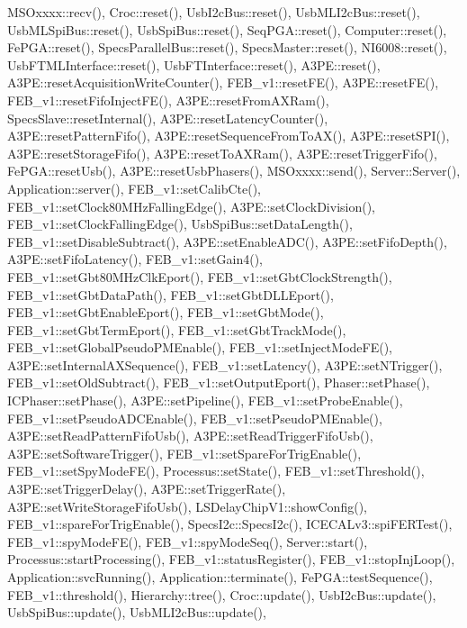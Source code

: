 M\+S\+Oxxxx\+::recv(), Croc\+::reset(), Usb\+I2c\+Bus\+::reset(), Usb\+M\+L\+I2c\+Bus\+::reset(), Usb\+M\+L\+Spi\+Bus\+::reset(), Usb\+Spi\+Bus\+::reset(), Seq\+P\+G\+A\+::reset(), Computer\+::reset(), Fe\+P\+G\+A\+::reset(), Specs\+Parallel\+Bus\+::reset(), Specs\+Master\+::reset(), N\+I6008\+::reset(), Usb\+F\+T\+M\+L\+Interface\+::reset(), Usb\+F\+T\+Interface\+::reset(), A3\+P\+E\+::reset(), A3\+P\+E\+::reset\+Acquisition\+Write\+Counter(), F\+E\+B\+\_\+v1\+::reset\+F\+E(), A3\+P\+E\+::reset\+F\+E(), F\+E\+B\+\_\+v1\+::reset\+Fifo\+Inject\+F\+E(), A3\+P\+E\+::reset\+From\+A\+X\+Ram(), Specs\+Slave\+::reset\+Internal(), A3\+P\+E\+::reset\+Latency\+Counter(), A3\+P\+E\+::reset\+Pattern\+Fifo(), A3\+P\+E\+::reset\+Sequence\+From\+To\+A\+X(), A3\+P\+E\+::reset\+S\+P\+I(), A3\+P\+E\+::reset\+Storage\+Fifo(), A3\+P\+E\+::reset\+To\+A\+X\+Ram(), A3\+P\+E\+::reset\+Trigger\+Fifo(), Fe\+P\+G\+A\+::reset\+Usb(), A3\+P\+E\+::reset\+Usb\+Phasers(), M\+S\+Oxxxx\+::send(), Server\+::\+Server(), Application\+::server(), F\+E\+B\+\_\+v1\+::set\+Calib\+Cte(), F\+E\+B\+\_\+v1\+::set\+Clock80\+M\+Hz\+Falling\+Edge(), A3\+P\+E\+::set\+Clock\+Division(), F\+E\+B\+\_\+v1\+::set\+Clock\+Falling\+Edge(), Usb\+Spi\+Bus\+::set\+Data\+Length(), F\+E\+B\+\_\+v1\+::set\+Disable\+Subtract(), A3\+P\+E\+::set\+Enable\+A\+D\+C(), A3\+P\+E\+::set\+Fifo\+Depth(), A3\+P\+E\+::set\+Fifo\+Latency(), F\+E\+B\+\_\+v1\+::set\+Gain4(), F\+E\+B\+\_\+v1\+::set\+Gbt80\+M\+Hz\+Clk\+Eport(), F\+E\+B\+\_\+v1\+::set\+Gbt\+Clock\+Strength(), F\+E\+B\+\_\+v1\+::set\+Gbt\+Data\+Path(), F\+E\+B\+\_\+v1\+::set\+Gbt\+D\+L\+L\+Eport(), F\+E\+B\+\_\+v1\+::set\+Gbt\+Enable\+Eport(), F\+E\+B\+\_\+v1\+::set\+Gbt\+Mode(), F\+E\+B\+\_\+v1\+::set\+Gbt\+Term\+Eport(), F\+E\+B\+\_\+v1\+::set\+Gbt\+Track\+Mode(), F\+E\+B\+\_\+v1\+::set\+Global\+Pseudo\+P\+M\+Enable(), F\+E\+B\+\_\+v1\+::set\+Inject\+Mode\+F\+E(), A3\+P\+E\+::set\+Internal\+A\+X\+Sequence(), F\+E\+B\+\_\+v1\+::set\+Latency(), A3\+P\+E\+::set\+N\+Trigger(), F\+E\+B\+\_\+v1\+::set\+Old\+Subtract(), F\+E\+B\+\_\+v1\+::set\+Output\+Eport(), Phaser\+::set\+Phase(), I\+C\+Phaser\+::set\+Phase(), A3\+P\+E\+::set\+Pipeline(), F\+E\+B\+\_\+v1\+::set\+Probe\+Enable(), F\+E\+B\+\_\+v1\+::set\+Pseudo\+A\+D\+C\+Enable(), F\+E\+B\+\_\+v1\+::set\+Pseudo\+P\+M\+Enable(), A3\+P\+E\+::set\+Read\+Pattern\+Fifo\+Usb(), A3\+P\+E\+::set\+Read\+Trigger\+Fifo\+Usb(), A3\+P\+E\+::set\+Software\+Trigger(), F\+E\+B\+\_\+v1\+::set\+Spare\+For\+Trig\+Enable(), F\+E\+B\+\_\+v1\+::set\+Spy\+Mode\+F\+E(), Processus\+::set\+State(), F\+E\+B\+\_\+v1\+::set\+Threshold(), A3\+P\+E\+::set\+Trigger\+Delay(), A3\+P\+E\+::set\+Trigger\+Rate(), A3\+P\+E\+::set\+Write\+Storage\+Fifo\+Usb(), L\+S\+Delay\+Chip\+V1\+::show\+Config(), F\+E\+B\+\_\+v1\+::spare\+For\+Trig\+Enable(), Specs\+I2c\+::\+Specs\+I2c(), I\+C\+E\+C\+A\+Lv3\+::spi\+F\+E\+R\+Test(), F\+E\+B\+\_\+v1\+::spy\+Mode\+F\+E(), F\+E\+B\+\_\+v1\+::spy\+Mode\+Seq(), Server\+::start(), Processus\+::start\+Processing(), F\+E\+B\+\_\+v1\+::status\+Register(), F\+E\+B\+\_\+v1\+::stop\+Inj\+Loop(), Application\+::svc\+Running(), Application\+::terminate(), Fe\+P\+G\+A\+::test\+Sequence(), F\+E\+B\+\_\+v1\+::threshold(), Hierarchy\+::tree(), Croc\+::update(), Usb\+I2c\+Bus\+::update(), Usb\+Spi\+Bus\+::update(), Usb\+M\+L\+I2c\+Bus\+::update(), 